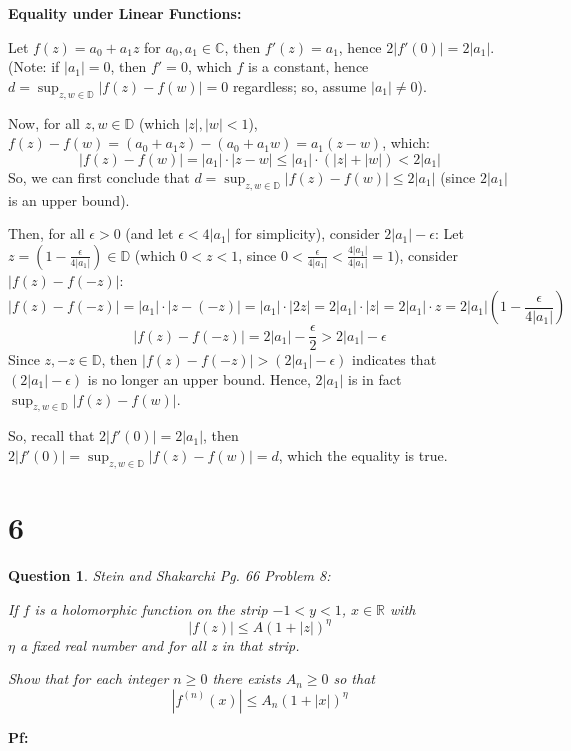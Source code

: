 \documentclass{article}
\newtheorem{question}{Question}
\begin{document}
\hfill

\textbf{Equality under Linear Functions:}

Let $f(z)=a_0+a_1z$ for $a_0,a_1\in\mathbb{C}$, then $f'(z) = a_1$, hence $2|f'(0)| = 2|a_1|$. (Note: if $|a_1|=0$, then $f'=0$, which $f$ is a constant, hence $d=\sup_{z,w\in\mathbb{D}}|f(z)-f(w)|=0$ regardless; so, assume $|a_1|\neq 0$).

Now, for all $z,w\in\mathbb{D}$ (which $|z|,|w|<1$), $f(z)-f(w)=(a_0+a_1z)-(a_0+a_1w) = a_1(z-w)$, which: 
$$|f(z)-f(w)| = |a_1|\cdot |z-w| \leq |a_1|\cdot (|z|+|w|) < 2|a_1|$$
So, we can first conclude that $d=\sup_{z,w\in\mathbb{D}}|f(z)-f(w)| \leq 2|a_1|$ (since $2|a_1|$ is an upper bound).

Then, for all $\epsilon>0$ (and let $\epsilon<4|a_1|$ for simplicity), consider $2|a_1|-\epsilon$:
Let $z=(1-\frac{\epsilon}{4|a_1|}) \in \mathbb{D}$ (which $0<z<1$, since $0<\frac{\epsilon}{4|a_1|}<\frac{4|a_1|}{4|a_1|}=1$), consider $|f(z)-f(-z)|$:
$$|f(z)-f(-z)| = |a_1|\cdot |z-(-z)| = |a_1|\cdot |2z| = 2|a_1|\cdot|z| = 2|a_1|\cdot z = 2|a_1|\left(1-\frac{\epsilon}{4|a_1|}\right)$$
$$|f(z)-f(-z)| = 2|a_1|-\frac{\epsilon}{2} > 2|a_1|-\epsilon$$
Since $z,-z\in \mathbb{D}$, then $|f(z)-f(-z)|>(2|a_1|-\epsilon)$ indicates that $(2|a_1|-\epsilon)$ is no longer an upper bound.
Hence, $2|a_1|$ is in fact $\sup_{z,w\in\mathbb{D}}|f(z)-f(w)|$.

\hfill

So, recall that $2|f'(0)|=2|a_1|$, then $2|f'(0)| = \sup_{z,w\in\mathbb{D}}|f(z)-f(w)| = d$, which the equality is true.

\break

\section*{6}
\begin{myBox}[]{}
    \begin{question}
        Stein and Shakarchi Pg. 66 Problem 8:

        If $f$ is a holomorphic function on the strip $-1 <y< 1$, $x\in\mathbb{R}$ with
        $$|f(z)|\leq A(1+|z|)^\eta$$
        $\eta$ a fixed real number and for all z in that strip.
        
        Show that for each integer $n\geq 0$ there exists $A_n\geq 0$ so that
        $$|f^{(n)}(x)|\leq A_n(1+|x|)^\eta$$
    \end{question}
\end{myBox}

\textbf{Pf:}
\end{document}
